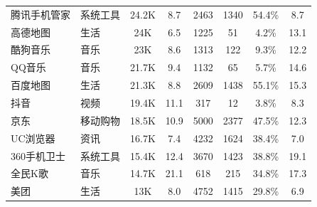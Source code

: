 \begin{ThreePartTable}
\begin{longtable}{l l c c c c c c}
        \rowcolor{gray!15} 腾讯手机管家 & 系统工具   & 24.2K                      & 8.7                        & 2463           & 1340                       & 54.4\%       & 8.7                        \\
        高德地图                        & 生活       & 24K                        & 6.5                        & 1225           & 51                         & 4.2\%        & 13.1                       \\
        \rowcolor{gray!15} 酷狗音乐     & 音乐       & 23K                        & 8.6                        & 1313           & 122                        & 9.3\%        & 12.2                       \\
        QQ音乐                          & 音乐       & 21.7K                      & 9.4                        & 1132           & 65                         & 5.7\%        & 14.6                       \\
        \rowcolor{gray!15} 百度地图     & 生活       & 21.3K                      & 8.8                        & 2609           & 1438                       & 55.1\%       & 15.3                       \\
        抖音                            & 视频       & 19.4K                      & 11.1                       & 317            & 12                         & 3.8\%        & 8.3                        \\
        \rowcolor{gray!15} 京东         & 移动购物   & 18.5K                      & 10.9                       & 5000           & 2377                       & 47.5\%       & 12.3                       \\
        UC浏览器                        & 资讯       & 16.7K                      & 7.4                        & 4232           & 1624                       & 38.4\%       & 7.0                        \\
        \rowcolor{gray!15} 360手机卫士  & 系统工具   & 15.4K                      & 12.4                       & 3670           & 1423                       & 38.8\%       & 19.1                       \\
        全民K歌                         & 音乐       & 14.7K                      & 21.1                       & 618            & 215                        & 34.8\%       & 17.3                       \\
        \rowcolor{gray!15} 美团         & 生活       & 13K                        & 8.0                        & 4752           & 1415                       & 29.8\%       & 6.9                        \\

\end{longtable}
\end{ThreePartTable}
